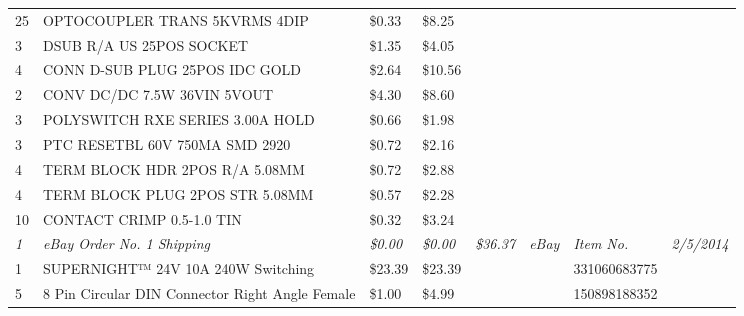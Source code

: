 \begin{table}[h]
{\begin{tabular}{llllllll}
25           & OPTOCOUPLER TRANS 5KVRMS 4DIP                     & \$0.33           & \$8.25           &                   &                   &                       &                     \\
3            & DSUB R/A US 25POS SOCKET                          & \$1.35           & \$4.05           &                   &                   &                       &                     \\
4            & CONN D-SUB PLUG 25POS IDC GOLD                    & \$2.64           & \$10.56          &                   &                   &                       &                     \\
2            & CONV DC/DC 7.5W 36VIN 5VOUT                       & \$4.30           & \$8.60           &                   &                   &                       &                     \\
3            & POLYSWITCH RXE SERIES 3.00A HOLD                  & \$0.66           & \$1.98           &                   &                   &                       &                     \\
3            & PTC RESETBL 60V 750MA SMD 2920                    & \$0.72           & \$2.16           &                   &                   &                       &                     \\
4            & TERM BLOCK HDR 2POS R/A 5.08MM                    & \$0.72           & \$2.88           &                   &                   &                       &                     \\
4            & TERM BLOCK PLUG 2POS STR 5.08MM                   & \$0.57           & \$2.28           &                   &                   &                       &                     \\
10           & CONTACT CRIMP 0.5-1.0 TIN                         & \$0.32           & \$3.24           &                   &                   &                       &                     \\  \hline \hline
\textit{1}   & \textit{eBay Order No. 1 Shipping}                & \textit{\$0.00}  & \textit{\$0.00}  & \textit{\$36.37}  & \textit{eBay}     & \textit{Item No.}     & \textit{2/5/2014}   \\
1            & SUPERNIGHT™ 24V 10A 240W Switching                & \$23.39          & \$23.39          &                   &                   & 331060683775          &                     \\
5            & 8 Pin Circular DIN Connector Right Angle Female   & \$1.00           & \$4.99           &                   &                   & 150898188352          &                     \\

\end{tabular}}
\end{table}
